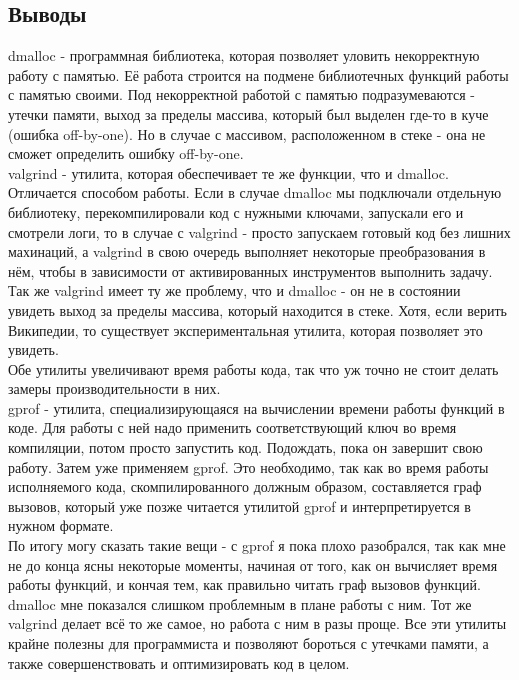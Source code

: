 \documentclass[12pt]{article}
\begin{document}
\subsection*{Выводы}

dmalloc - программная библиотека, которая позволяет уловить некорректную работу с памятью. Её работа строится на подмене библиотечных функций работы с памятью своими. Под некорректной работой с памятью подразумеваются - утечки памяти, выход за пределы массива, который был выделен где-то в куче (ошибка off-by-one). Но в случае с массивом, расположенном в стеке - она не сможет определить ошибку off-by-one.\\
valgrind - утилита, которая обеспечивает те же функции, что и dmalloc. Отличается способом работы. Если в случае dmalloc мы подключали отдельную библиотеку, перекомпилировали код с нужными ключами, запускали его и смотрели логи, то в случае с valgrind - просто запускаем готовый код без лишних махинаций, а valgrind в свою очередь выполняет некоторые преобразования в нём, чтобы в зависимости от активированных инструментов выполнить задачу. Так же valgrind имеет ту же проблему, что и dmalloc - он не в состоянии увидеть выход за пределы массива, который находится в стеке. Хотя, если верить Википедии, то существует экспериментальная утилита, которая позволяет это увидеть.\\
Обе утилиты увеличивают время работы кода, так что уж точно не стоит делать замеры производительности в них.\\
gprof - утилита, специализирующаяся на вычислении времени работы функций в коде. Для работы с ней надо применить соответствующий ключ во время компиляции, потом просто запустить код. Подождать, пока он завершит свою работу. Затем уже применяем gprof. Это необходимо, так как во время работы исполняемого кода, скомпилированного должным образом, составляется граф вызовов, который уже позже читается утилитой gprof и интерпретируется в нужном формате.\\
По итогу могу сказать такие вещи - с gprof я пока плохо разобрался, так как мне не до конца ясны некоторые моменты, начиная от того, как он вычисляет время работы функций, и кончая тем, как правильно читать граф вызовов функций. dmalloc мне показался слишком проблемным в плане работы с ним. Тот же valgrind делает всё то же самое, но работа с ним в разы проще. Все эти утилиты крайне полезны для программиста и позволяют бороться с утечками памяти, а также совершенствовать и оптимизировать код в целом.
\end{document}
